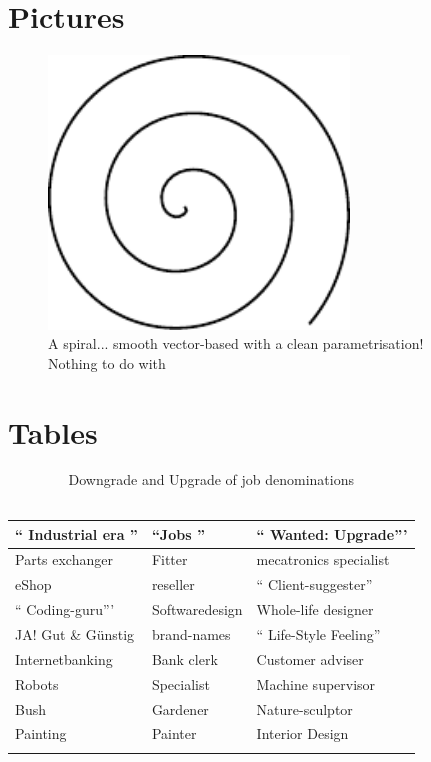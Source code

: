 \section{Pictures}

\begin{figure}[h]
\centering
\includegraphics[width=8cm]{pics/spiral.pdf}
\caption{A spiral... smooth vector-based with a clean parametrisation! \\ Nothing to do with \cite{Gage:18}}\label{fig:spiral}
\end{figure}
\FloatBarrier

\section{Tables}

\begin{table}[H]
\small
\centering
\begin{tabular}{p{5cm}|l|p{3cm}}
`` Industrial era '' &  ``Jobs '' & `` Wanted: Upgrade''' \\ \hline
Parts exchanger & Fitter & mecatronics specialist \\
eShop & reseller & `` Client-suggester'' \\
`` Coding-guru''' & Softwaredesign & Whole-life designer \\
JA! Gut \& Günstig & brand-names & `` Life-Style Feeling'' \\
Internetbanking & Bank clerk & Customer adviser \\
Robots & Specialist & Machine supervisor \\
Bush & Gardener & Nature-sculptor \\
Painting & Painter & Interior Design \\
 &  & \\
\end{tabular}
\caption[Downgrade and upgrade of job denominations]{Downgrade and Upgrade of job denominations \\ \ \ \ \cite{DueckKo:2016}}
\label{tab:Downgrade and Upgrade of job denominations}
\end{table} 

